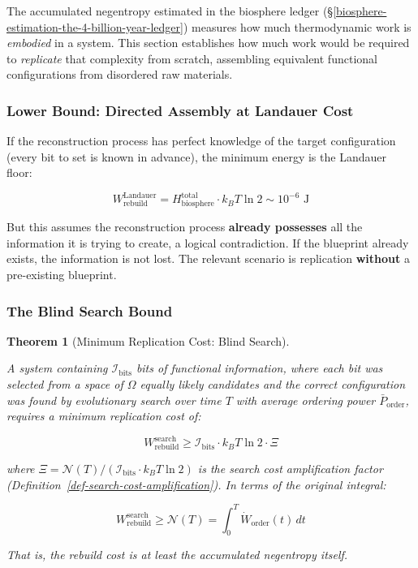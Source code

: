 \documentclass[11pt]{article}
\theoremstyle{plain}
\newtheorem{theorem}{Theorem}
\theoremstyle{definition}
\theoremstyle{remark}
\let\origsubsubsection\subsubsection
\renewcommand{\subsubsection}{\needspace{4\baselineskip}\origsubsubsection}
\begin{document}
The accumulated negentropy estimated in the biosphere ledger
(§\ref{biosphere-estimation-the-4-billion-year-ledger}) measures how
much thermodynamic work is \emph{embodied} in a system. This section
establishes how much work would be required to \emph{replicate} that
complexity from scratch, assembling equivalent functional configurations
from disordered raw materials.

\subsubsection{Lower Bound: Directed Assembly at Landauer
Cost}\label{lower-bound-directed-assembly-at-landauer-cost}

If the reconstruction process has perfect knowledge of the target
configuration (every bit to set is known in advance), the minimum energy
is the Landauer floor:

\[W_{\text{rebuild}}^{\text{Landauer}} = H_{\text{biosphere}}^{\text{total}} \cdot k_B T \ln 2 \sim 10^{-6} \text{ J}\]

But this assumes the reconstruction process \textbf{already possesses}
all the information it is trying to create, a logical contradiction. If
the blueprint already exists, the information is not lost. The relevant
scenario is replication \textbf{without} a pre-existing blueprint.

\subsubsection{The Blind Search Bound}\label{the-blind-search-bound}

\begin{theorem}[Minimum Replication Cost: Blind Search]
\label{thm-minimum-replication-cost}

A system containing $\mathcal{I}_{\text{bits}}$ bits of functional information, where each bit was selected from a space of $\Omega$ equally likely candidates and the correct configuration was found by evolutionary search over time $T$ with average ordering power $\bar{P}_{\text{order}}$, requires a minimum replication cost of:

$$W_{\text{rebuild}}^{\text{search}} \geq \mathcal{I}_{\text{bits}} \cdot k_B T \ln 2 \cdot \Xi$$

where $\Xi = \mathcal{N}(T) / ({\mathcal{I}_{\text{bits}} \cdot k_B T \ln 2})$ is the search cost amplification factor (Definition~\ref{def-search-cost-amplification}). In terms of the original integral:

$$W_{\text{rebuild}}^{\text{search}} \geq \mathcal{N}(T) = \int_0^T \dot{W}_{\text{order}}(t) \, dt$$

That is, the rebuild cost is at least the accumulated negentropy itself.
\end{theorem}
\end{document}
